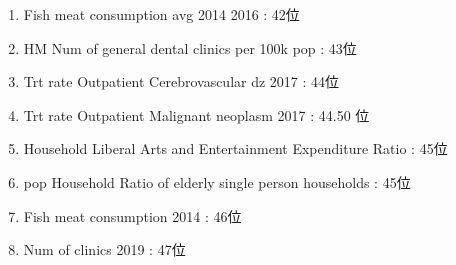 \begin{multicols}{2}
\begin{enumerate}
	\item Fish meat consumption avg 2014 2016 : 42位
	\item HM Num of general dental clinics per 100k pop : 43位
	\item Trt rate Outpatient Cerebrovascular dz 2017 : 44位
	\item Trt rate Outpatient Malignant neoplasm 2017 : 44.50 位
	\item Household Liberal Arts and Entertainment Expenditure Ratio : 45位
	\item pop Household Ratio of elderly single person households : 45位
	\item Fish meat consumption 2014 : 46位
	\item Num of clinics 2019 : 47位
\end{enumerate}

\end{multicols}


